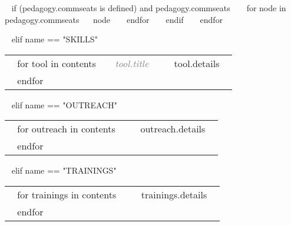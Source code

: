 \begin{minipage}{\textwidth}
\begin{entrylist}
  ~{ if (pedagogy.commseats is defined) and pedagogy.commseats }~
    ~{ for node in pedagogy.commseats}~
    \entry
      {}
      {~{{ node }}~}
      {}
      {}
    ~{ endfor }~
  ~{ endif }~
~{ endfor }~
\end{entrylist}


~{ elif name == "SKILLS" }~

\begin{tabular}{ @{} p{32mm} p{135mm} @{} }
  ~{ for tool in contents }~
  \small \textcolor{gray}{{\emph{~{{ tool.title }}~}}} & {\small ~{{ tool.details }}~} \\
  ~{ endfor }~
\end{tabular}


~{ elif name == "OUTREACH" }~

\begin{tabular}{ @{} p{32mm} p{135mm} @{} }
  ~{ for outreach in contents }~
  \small \textcolor{gray}{{\emph{ }}} & {\small ~{{ outreach.details }}~} \\
  ~{ endfor }~
\end{tabular}


~{ elif name == "TRAININGS" }~

\begin{tabular}{ @{} p{32mm} p{135mm} @{} }
  ~{ for trainings in contents }~
  \small \textcolor{gray}{{\emph{ }}} & {\small ~{{ trainings.details }}~} \\
  ~{ endfor }~
\end{tabular}



\end{minipage}
